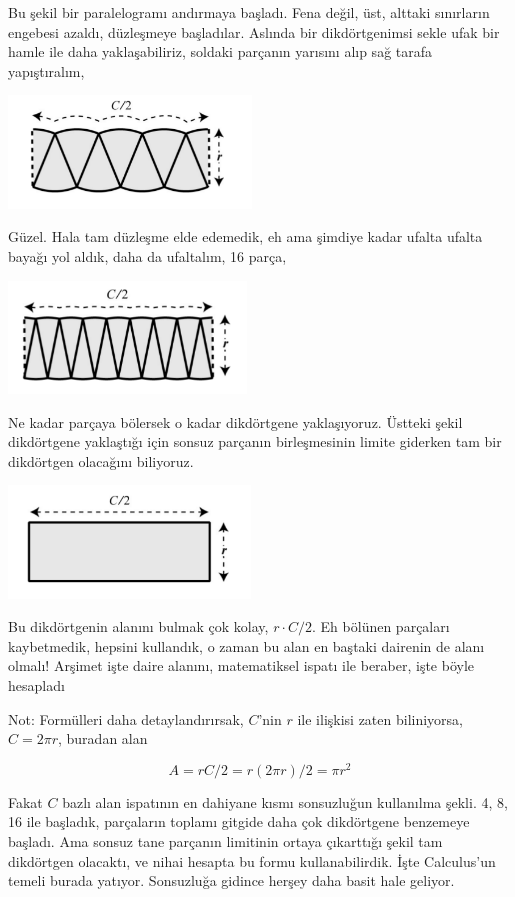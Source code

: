 \documentclass[12pt,fleqn]{article}\usepackage{../../common}
\begin{document}
Bu şekil bir paralelogramı andırmaya başladı. Fena değil, üst, alttaki
sınırların engebesi azaldı, düzleşmeye başladılar. Aslında bir
dikdörtgenimsi sekle ufak bir hamle ile daha yaklaşabiliriz, soldaki
parçanın yarısını alıp sağ tarafa yapıştıralım,

\includegraphics[height=3cm]{circ_5.png}

Güzel. Hala tam düzleşme elde edemedik, eh ama şimdiye kadar ufalta ufalta
bayağı yol aldık, daha da ufaltalım, 16 parça,

\includegraphics[height=3cm]{circ_6.png}

Ne kadar parçaya bölersek o kadar dikdörtgene yaklaşıyoruz. Üstteki şekil
dikdörtgene yaklaştığı için sonsuz parçanın birleşmesinin limite giderken
tam bir dikdörtgen olacağını biliyoruz. 

\includegraphics[height=3cm]{circ_7.png}

Bu dikdörtgenin alanını bulmak çok kolay, $r \cdot C/2$. Eh bölünen parçaları
kaybetmedik, hepsini kullandık, o zaman bu alan en baştaki dairenin de alanı
olmalı! Arşimet işte daire alanını, matematiksel ispatı ile beraber, işte böyle
hesapladı

Not: Formülleri daha detaylandırırsak, $C$'nin $r$ ile ilişkisi zaten
biliniyorsa, $C = 2 \pi r$, buradan alan

$$
A = r C/2 = r (2 \pi r)/2 = \pi r^2 
$$

Fakat $C$ bazlı alan ispatının en dahiyane kısmı sonsuzluğun kullanılma
şekli. 4, 8, 16 ile başladık, parçaların toplamı gitgide daha çok dikdörtgene
benzemeye başladı. Ama sonsuz tane parçanın limitinin ortaya çıkarttığı şekil
tam dikdörtgen olacaktı, ve nihai hesapta bu formu kullanabilirdik. İşte
Calculus'un temeli burada yatıyor. Sonsuzluğa gidince herşey daha basit hale
geliyor.
\end{document}
